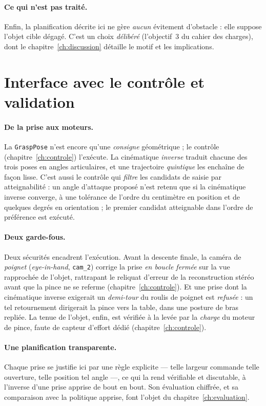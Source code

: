 \paragraph{Ce qui n'est pas traité.} Enfin, la planification décrite ici ne gère \emph{aucun} évitement d'obstacle : elle suppose l'objet cible dégagé. C'est un choix \emph{délibéré} (l'objectif~3 du cahier des charges), dont le chapitre~\ref{ch:discussion} détaille le motif et les implications.

\section{Interface avec le contrôle et validation}
\label{sec:grasp-interface}

\paragraph{De la prise aux moteurs.} La \texttt{GraspPose} n'est encore qu'une \emph{consigne} géométrique ; le contrôle (chapitre~\ref{ch:controle}) l'exécute. La cinématique \emph{inverse} traduit chacune des trois poses en angles articulaires, et une trajectoire \emph{quintique} les enchaîne de façon lisse. C'est aussi le contrôle qui \emph{filtre} les candidats de saisie par atteignabilité : un angle d'attaque proposé n'est retenu que si la cinématique inverse converge, à une tolérance de l'ordre du centimètre en position et de quelques degrés en orientation ; le premier candidat atteignable dans l'ordre de préférence est exécuté.

\paragraph{Deux garde-fous.} Deux sécurités encadrent l'exécution. Avant la descente finale, la caméra de \emph{poignet} (\emph{eye-in-hand}, \texttt{cam\_2}) corrige la prise \emph{en boucle fermée} sur la vue rapprochée de l'objet, rattrapant le reliquat d'erreur de la reconstruction stéréo avant que la pince ne se referme (chapitre~\ref{ch:controle}). Et une prise dont la cinématique inverse exigerait un \emph{demi-tour} du roulis de poignet est \emph{refusée} : un tel retournement dirigerait la pince vers la table, dans une posture de bras repliée. La tenue de l'objet, enfin, est vérifiée à la levée par la \emph{charge} du moteur de pince, faute de capteur d'effort dédié (chapitre~\ref{ch:controle}).

\paragraph{Une planification transparente.} Chaque prise se justifie ici par une règle explicite --- telle largeur commande telle ouverture, telle position tel angle ---, ce qui la rend vérifiable et discutable, à l'inverse d'une prise apprise de bout en bout. Son évaluation chiffrée, et sa comparaison avec la politique apprise, font l'objet du chapitre~\ref{ch:evaluation}.
